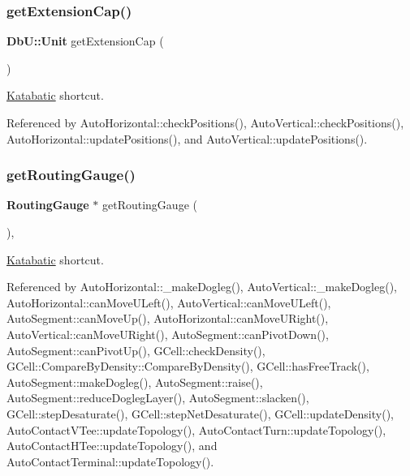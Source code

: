 \subsubsection{\texorpdfstring{get\+Extension\+Cap()}{getExtensionCap()}}
{\footnotesize\ttfamily \textbf{ Db\+U\+::\+Unit} get\+Extension\+Cap (\begin{DoxyParamCaption}{ }\end{DoxyParamCaption})\hspace{0.3cm}{\ttfamily [static]}}

\hyperlink{namespaceKatabatic}{Katabatic} shortcut. 

Referenced by Auto\+Horizontal\+::check\+Positions(), Auto\+Vertical\+::check\+Positions(), Auto\+Horizontal\+::update\+Positions(), and Auto\+Vertical\+::update\+Positions().

\mbox{\label{classKatabatic_1_1Session_a9a05289b33122f312aa2c88c4b023292}} 
\subsubsection{\texorpdfstring{get\+Routing\+Gauge()}{getRoutingGauge()}}
{\footnotesize\ttfamily \textbf{ Routing\+Gauge} $\ast$ get\+Routing\+Gauge (\begin{DoxyParamCaption}{ }\end{DoxyParamCaption})\hspace{0.3cm}{\ttfamily [inline]}, {\ttfamily [static]}}

\hyperlink{namespaceKatabatic}{Katabatic} shortcut. 

Referenced by Auto\+Horizontal\+::\+\_\+make\+Dogleg(), Auto\+Vertical\+::\+\_\+make\+Dogleg(), Auto\+Horizontal\+::can\+Move\+U\+Left(), Auto\+Vertical\+::can\+Move\+U\+Left(), Auto\+Segment\+::can\+Move\+Up(), Auto\+Horizontal\+::can\+Move\+U\+Right(), Auto\+Vertical\+::can\+Move\+U\+Right(), Auto\+Segment\+::can\+Pivot\+Down(), Auto\+Segment\+::can\+Pivot\+Up(), G\+Cell\+::check\+Density(), G\+Cell\+::\+Compare\+By\+Density\+::\+Compare\+By\+Density(), G\+Cell\+::has\+Free\+Track(), Auto\+Segment\+::make\+Dogleg(), Auto\+Segment\+::raise(), Auto\+Segment\+::reduce\+Dogleg\+Layer(), Auto\+Segment\+::slacken(), G\+Cell\+::step\+Desaturate(), G\+Cell\+::step\+Net\+Desaturate(), G\+Cell\+::update\+Density(), Auto\+Contact\+V\+Tee\+::update\+Topology(), Auto\+Contact\+Turn\+::update\+Topology(), Auto\+Contact\+H\+Tee\+::update\+Topology(), and Auto\+Contact\+Terminal\+::update\+Topology().

